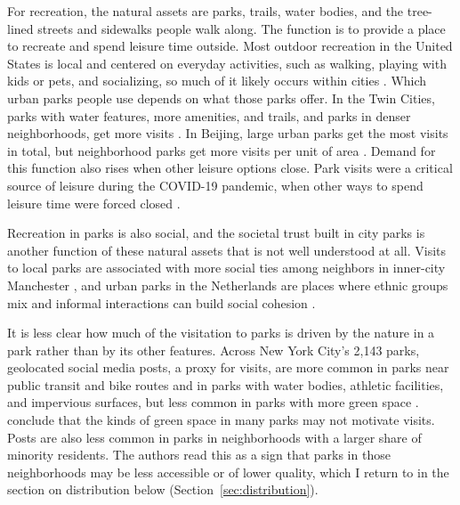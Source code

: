 \documentclass[12pt]{article}
\begin{document}
For recreation, the natural assets are parks, trails, water bodies, and the tree-lined streets and sidewalks people walk along. The function is to provide a place to recreate and spend leisure time outside. Most outdoor recreation in the United States is local and centered on everyday activities, such as walking, playing with kids or pets, and socializing, so much of it likely occurs within cities \citep{creelNationalValueLocal2026}. Which urban parks people use depends on what those parks offer. In the Twin Cities, parks with water features, more amenities, and trails, and parks in denser neighborhoods, get more visits \citep{donahue_using_2018}. In Beijing, large urban parks get the most visits in total, but neighborhood parks get more visits per unit of area \citep{zhang_recreational_2018}. Demand for this function also rises when other leisure options close. Park visits were a critical source of leisure during the COVID-19 pandemic, when other ways to spend leisure time were forced closed \citep{gengImpactsCOVID19Pandemic2021,venter_urban_2020,dayValueGreenspace2020}. 

Recreation in parks is also social, and the societal trust built in city parks is another function of these natural assets that is not well understood at all. Visits to local parks are associated with more social ties among neighbors in inner-city Manchester \citep{kazmierczakContributionLocalParks2013}, and urban parks in the Netherlands are places where ethnic groups mix and informal interactions can build social cohesion \citep{petersSocialInteractionsUrban2010}. 

It is less clear how much of the visitation to parks is driven by the nature in a park rather than by its other features. Across New York City's 2,143 parks, geolocated social media posts, a proxy for visits, are more common in parks near public transit and bike routes and in parks with water bodies, athletic facilities, and impervious surfaces, but less common in parks with more green space \citep{hamstead_geolocated_2018}. \citet{hamstead_geolocated_2018} conclude that the kinds of green space in many parks may not motivate visits. Posts are also less common in parks in neighborhoods with a larger share of minority residents. The authors read this as a sign that parks in those neighborhoods may be less accessible or of lower quality, which I return to in the section on distribution below (Section~\ref{sec:distribution}).
\end{document}

